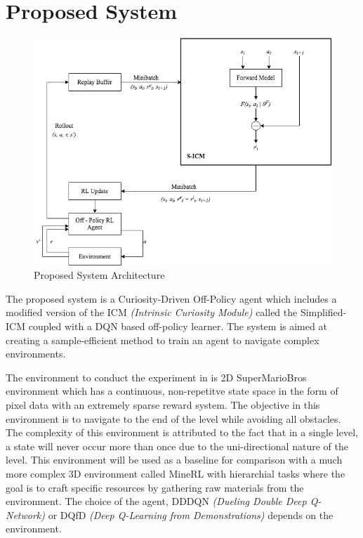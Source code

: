 \documentclass[12pt,a4paper]{article}
\begin{document}
\section{Proposed System}

\begin{figure}[H]
  \centering
  \includegraphics[scale=0.60]{review-0-architecture.png}
  \caption{Proposed System Architecture}
  \label{fig:proposed-system}
\end{figure}

The proposed system is a Curiosity-Driven Off-Policy agent which includes a modified version
of the ICM \textit{(Intrinsic Curiosity Module)} called the Simplified-ICM \cite{cdl2} coupled with a 
DQN based off-policy learner. The system is aimed at creating a sample-efficient method to train an agent to
navigate complex environments.

The environment to conduct the experiment in is 2D SuperMarioBros environment which 
has a continuous, non-repetitve state space in the form of pixel data with an 
extremely sparse reward system. The objective in this environment is to navigate to the 
end of the level while avoiding all obstacles. The complexity of this environment is attributed
to the fact that in a single level, a state will never occur more than once due to the
uni-directional nature of the level. This environment will be used as a baseline for comparison
with a much more complex 3D environment called MineRL with hierarchial tasks where the 
goal is to craft specific resources by gathering raw materials from the environment. The choice of the agent, 
DDDQN \textit{(Dueling Double Deep Q-Network)} \cite{duel}\cite{double} or DQfD \textit{(Deep Q-Learning from Demonstrations)} 
depends on the environment.
\end{document}
